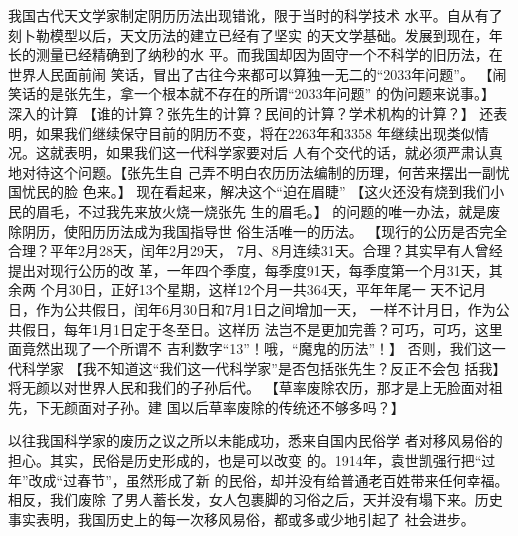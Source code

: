 我国古代天文学家制定阴历历法出现错讹，限于当时的科学技术
水平。自从有了刻卜勒模型以后，天文历法的建立已经有了坚实
的天文学基础。发展到现在，年长的测量已经精确到了纳秒的水
平。而我国却因为固守一个不科学的旧历法，在世界人民面前闹
笑话，冒出了古往今来都可以算独一无二的“2033年问题”。
\normalfont
【闹笑话的是张先生，拿一个根本就不存在的所谓“2033年问题”
的伪问题来说事。】
\fangsong
深入的计算
\normalfont
【谁的计算？张先生的计算？民间的计算？学术机构的计算？】
\fangsong
还表明，如果我们继续保守目前的阴历不变，将在2263年和3358
年继续出现类似情况。这就表明，如果我们这一代科学家要对后
人有个交代的话，就必须严肃认真地对待这个问题。【张先生自
己弄不明白农历历法编制的历理，何苦来摆出一副忧国忧民的脸
色来。】
\fangsong
现在看起来，解决这个“迫在眉睫”
\normalfont
【这火还没有烧到我们小民的眉毛，不过我先来放火烧一烧张先
生的眉毛。】
\fangsong
的问题的唯一办法，就是废除阴历，使阳历历法成为我国指导世
俗生活唯一的历法。
\normalfont
【现行的公历是否完全合理？平年2月28天，闰年2月29天，
7月、8月连续31天。合理？其实早有人曾经提出对现行公历的改
革，一年四个季度，每季度91天，每季度第一个月31天，其余两
个月30日，正好13个星期，这样12个月一共364天，平年年尾一
天不记月日，作为公共假日，闰年6月30日和7月1日之间增加一天，
一样不计月日，作为公共假日，每年1月1日定于冬至日。这样历
法岂不是更加完善？可巧，可巧，这里面竟然出现了一个所谓不
吉利数字“13”！哦，“魔鬼的历法”！】
\fangsong
否则，我们这一代科学家
\normalfont
【我不知道这“我们这一代科学家”是否包括张先生？反正不会包
括我】
\fangsong
将无颜以对世界人民和我们的子孙后代。
\normalfont
【草率废除农历，那才是上无脸面对祖先，下无颜面对子孙。建
国以后草率废除的传统还不够多吗？】

\fangsong
以往我国科学家的废历之议之所以未能成功，悉来自国内民俗学
者对移风易俗的担心。其实，民俗是历史形成的，也是可以改变
的。1914年，袁世凯强行把“过年”改成“过春节”，虽然形成了新
的民俗，却并没有给普通老百姓带来任何幸福。相反，我们废除
了男人蓄长发，女人包裹脚的习俗之后，天并没有塌下来。历史
事实表明，我国历史上的每一次移风易俗，都或多或少地引起了
社会进步。

